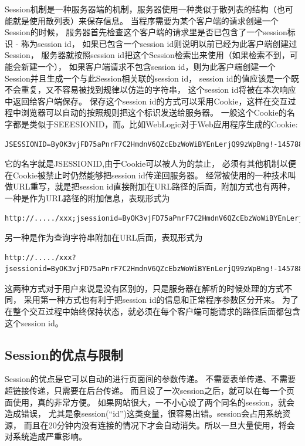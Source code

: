 \documentclass{book}
\begin{document}
Session机制是一种服务器端的机制，服务器使用一种类似于散列表的结构（也可能就是使用散列表）来保存信息。
当程序需要为某个客户端的请求创建一个Session的时候，
服务器首先检查这个客户端的请求里是否已包含了一个session标识 - 称为session id，
如果已包含一个session id则说明以前已经为此客户端创建过Session，
服务器就按照session id把这个Session检索出来使用（如果检索不到，可能会新建一个），
如果客户端请求不包含session id，则为此客户端创建一个Session并且生成一个与此Session相关联的session id，
session id的值应该是一个既不会重复，又不容易被找到规律以仿造的字符串，
这个session id将被在本次响应中返回给客户端保存。 
保存这个session id的方式可以采用Cookie，这样在交互过程中浏览器可以自动的按照规则把这个标识发送给服务器。
一般这个Cookie的名字都是类似于SEEESIONID，而。比如WebLogic对于Web应用程序生成的Cookie:

\begin{lstlisting}
JSESSIONID=ByOK3vjFD75aPnrF7C2HmdnV6QZcEbzWoWiBYEnLerjQ99zWpBng!-145788764 
\end{lstlisting}

它的名字就是JSESSIONID,由于Cookie可以被人为的禁止，
必须有其他机制以便在Cookie被禁止时仍然能够把session id传递回服务器。
经常被使用的一种技术叫做URL重写，就是把session id直接附加在URL路径的后面，附加方式也有两种，
一种是作为URL路径的附加信息，表现形式为

\begin{lstlisting}
http://...../xxx;jsessionid=ByOK3vjFD75aPnrF7C2HmdnV6QZcEbzWoWiBYEnLerjQ99zWpBng!-145788764
\end{lstlisting}
 

另一种是作为查询字符串附加在URL后面，表现形式为

\begin{lstlisting}
http://...../xxx?jsessionid=ByOK3vjFD75aPnrF7C2HmdnV6QZcEbzWoWiBYEnLerjQ99zWpBng!-145788764 
\end{lstlisting}

这两种方式对于用户来说是没有区别的，只是服务器在解析的时候处理的方式不同，
采用第一种方式也有利于把session id的信息和正常程序参数区分开来。 
为了在整个交互过程中始终保持状态，就必须在每个客户端可能请求的路径后面都包含这个session id。

\subsection{Session的优点与限制}

Session的优点是它可以自动的进行页面间的参数传递。
不需要表单传递、不需要超链接传递，只需要在后台传递。
而且设了一次session之后，就可以在每一个页面使用，真的非常方便。
如果网站很大，一不小心设了两个同名的session，就会造成错误，
尤其是象session(“id”)这类变量，很容易出错。session会占用系统资源，
而且在20分钟内没有连接的情况下才会自动消失。所以一旦大量使用，将会对系统造成严重影响。
\end{document}
